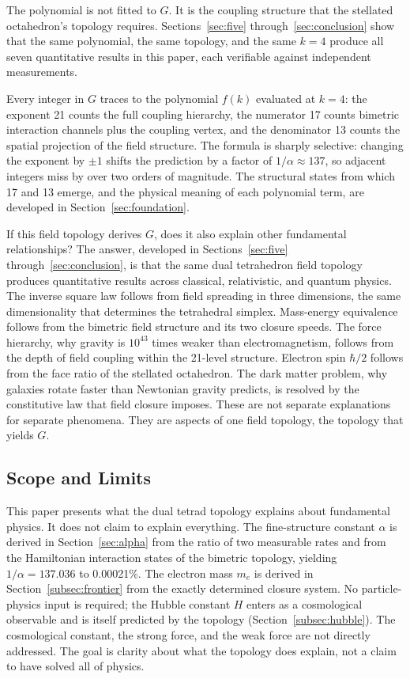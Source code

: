 \documentclass[aps,prd,preprint,superscriptaddress,showpacs,preprintnumbers,amsmath,amssymb,nofootinbib]{revtex4-2}
\begin{document}
The polynomial is not fitted to $G$. It is the coupling structure that the stellated octahedron's topology requires. Sections~\ref{sec:five} through~\ref{sec:conclusion} show that the same polynomial, the same topology, and the same $k = 4$ produce all seven quantitative results in this paper, each verifiable against independent measurements.

Every integer in $G$ traces to the polynomial $f(k)$ evaluated at $k = 4$: the exponent 21 counts the full coupling hierarchy, the numerator 17 counts bimetric interaction channels plus the coupling vertex, and the denominator 13 counts the spatial projection of the field structure. The formula is sharply selective: changing the exponent by $\pm 1$ shifts the prediction by a factor of $1/\alpha \approx 137$, so adjacent integers miss by over two orders of magnitude. The structural states from which 17 and 13 emerge, and the physical meaning of each polynomial term, are developed in Section~\ref{sec:foundation}.

If this field topology derives $G$, does it also explain other fundamental relationships? The answer, developed in Sections~\ref{sec:five} through~\ref{sec:conclusion}, is that the same dual tetrahedron field topology produces quantitative results across classical, relativistic, and quantum physics. The inverse square law follows from field spreading in three dimensions, the same dimensionality that determines the tetrahedral simplex. Mass-energy equivalence follows from the bimetric field structure and its two closure speeds. The force hierarchy, why gravity is $10^{43}$ times weaker than electromagnetism, follows from the depth of field coupling within the 21-level structure. Electron spin $\hbar/2$ follows from the face ratio of the stellated octahedron. The dark matter problem, why galaxies rotate faster than Newtonian gravity predicts, is resolved by the constitutive law that field closure imposes. These are not separate explanations for separate phenomena. They are aspects of one field topology, the topology that yields $G$.

\subsection{Scope and Limits}
\label{subsec:limits}

This paper presents what the dual tetrad topology explains about fundamental physics. It does not claim to explain everything. The fine-structure constant $\alpha$ is derived in Section~\ref{sec:alpha} from the ratio of two measurable rates and from the Hamiltonian interaction states of the bimetric topology, yielding $1/\alpha = 137.036$ to 0.00021\%. The electron mass $m_e$ is derived in Section~\ref{subsec:frontier} from the exactly determined closure system. No particle-physics input is required; the Hubble constant $H$ enters as a cosmological observable and is itself predicted by the topology (Section~\ref{subsec:hubble}). The cosmological constant, the strong force, and the weak force are not directly addressed. The goal is clarity about what the topology does explain, not a claim to have solved all of physics.
\end{document}
